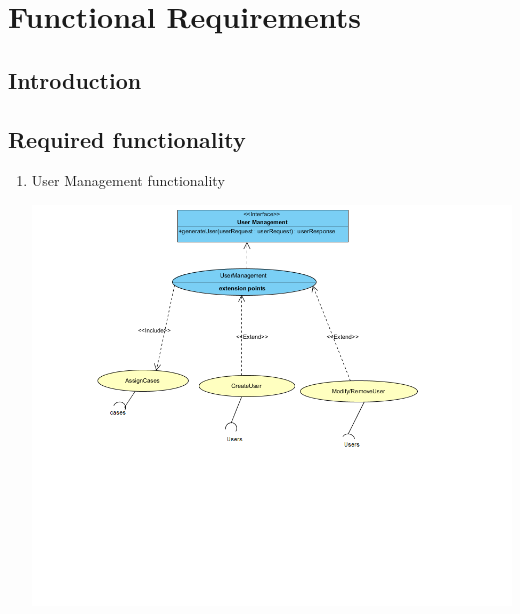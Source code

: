 \documentclass[10pt,a4paper]{article}
\begin{document}
\section{Functional Requirements}
\subsection{Introduction}


\subsection{Required functionality}
\begin{enumerate}
	\item User Management functionality
	\begin{center}
		\includegraphics[scale=0.4]{UserManagementRequirementFunctionality.png}
		

\end{center}
\end{enumerate}
\end{document}
